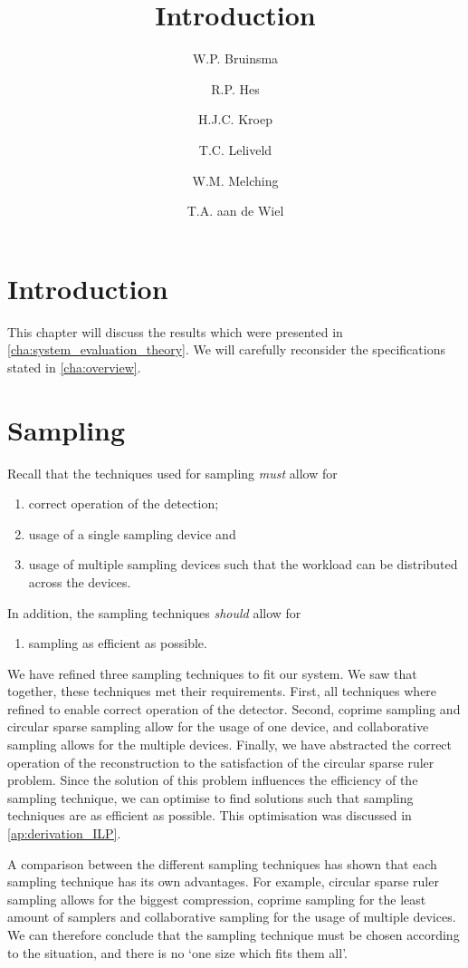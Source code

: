 \documentclass[a4paper, openany, oneside]{memoir}
\title{Introduction}
\author{W.P. Bruinsma \and R.P. Hes \and H.J.C. Kroep \and T.C. Leliveld \and W.M. Melching \and T.A. aan de Wiel}
\begin{document}
\section{Introduction}
This chapter will discuss the results which were presented in \cref{cha:system_evaluation_theory}. We will carefully reconsider the specifications stated in \cref{cha:overview}.

\section{Sampling}
Recall that the techniques used for sampling \emph{must} allow for
\begin{enumerate}
    \item correct operation of the detection;
    \item usage of a single sampling device and
    \item usage of multiple sampling devices such that the workload can be distributed across the devices.
\end{enumerate}
In addition, the sampling techniques \emph{should} allow for
\begin{enumerate}
    \item sampling as efficient as possible.
\end{enumerate}

We have refined three sampling techniques to fit our system. We saw that together, these techniques met their requirements. First, all techniques where refined to enable correct operation of the detector. Second, coprime sampling and circular sparse sampling allow for the usage of one device, and collaborative sampling allows for the multiple devices. Finally, we have abstracted the correct operation of the reconstruction to the satisfaction of the circular sparse ruler problem. Since the solution of this problem influences the efficiency of the sampling technique, we can optimise to find solutions such that sampling techniques are as efficient as possible. This optimisation was discussed in \cref{ap:derivation_ILP}.

A comparison between the different sampling techniques has shown that each sampling technique has its own advantages. For example, circular sparse ruler sampling allows for the biggest compression, coprime sampling for the least amount of samplers and collaborative sampling for the usage of multiple devices. We can therefore conclude that the sampling technique must be chosen according to the situation, and there is no `one size which fits them all'. 
\end{document}
